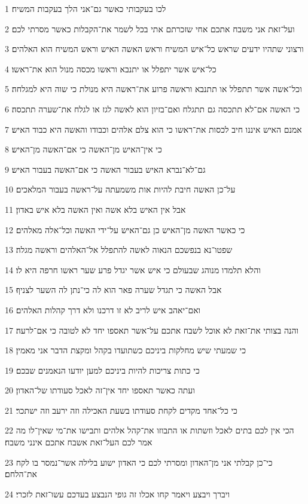 \par 1 לכו בעקבותי כאשר גם־אני הלך בעקבות המשיח׃
\par 2 ועל־זאת אני משבח אתכם אחי שזכרתם אתי בכל לשמר את־הקבלות כאשר מסרתי לכם׃
\par 3 ורצוני שתהיו ידעים שראש כל־איש המשיח וראש האשה האיש וראש המשיח הוא האלהים׃
\par 4 כל־איש אשר יתפלל או יתנבא וראשו מכסה מנול הוא את־ראשו׃
\par 5 וכל־אשה אשר תתפלל או תתנבא וראשה פרוע את־ראשה היא מנולת כי שוה היא למגלחה׃
\par 6 כי האשה אם־לא תתכסה גם תתגלח ואם־בזיון הוא לאשה לגז או לגלח את־שערה תתכסה׃
\par 7 אמנם האיש איננו חיב לכסות את־ראשו כי הוא צלם אלהים וכבודו והאשה היא כבוד האיש׃
\par 8 כי אין־האיש מן־האשה כי אם־האשה מן־האיש׃
\par 9 גם־לא־נברא האיש בעבור האשה כי אם־האשה בעבור האיש׃
\par 10 על־כן האשה חיבת להיות אות משמעתה על־ראשה בעבור המלאכים׃
\par 11 אבל אין האיש בלא אשה ואין האשה בלא איש באדון׃
\par 12 כי כאשר האשה מן־האיש כן גם־האיש על־ידי האשה וכל־אלה מאלהים׃
\par 13 שפטו־נא בנפשכם הנאוה לאשה להתפלל אל־האלהים וראשה מגלה׃
\par 14 והלא תלמדו מנוהג שבעולם כי איש אשר יגדל פרע שער ראשו חרפה היא לו׃
\par 15 אבל האשה כי תגדל שערה פאר הוא לה כי־נתן לה השער לצניף׃
\par 16 ואם־יאהב איש לריב לא זו דרכנו ולא דרך קהלות האלהים׃
\par 17 והנה בצותי את־זאת לא אוכל לשבח אתכם על־אשר תאספו יחד לא לטובה כי אם־לרעה׃
\par 18 כי שמעתי שיש מחלקות ביניכם כשתועדו בקהל ומקצת הדבר אני מאמין׃
\par 19 כי כתות צריכות להיות ביניכם למען יודעו הנאמנים שבכם׃
\par 20 ועתה כאשר תאספו יחד אין־זה לאכל סעודתו של־האדון׃
\par 21 כי כל־אחד מקדים לקחת סעודתו בשעת האכילה וזה ירעב וזה ישתכר׃
\par 22 הכי אין לכם בתים לאכל וזשתות או התבוזו את־קהל אלהים ותבישו את־מי שאין־לו מה אמר לכם העל־זאת אשבח אתכם אינני משבח׃
\par 23 כי־כן קבלתי אני מן־האדון ומסרתי לכם כי האדון ישוע בלילה אשר־נמסר בו לקח את־הלחם׃
\par 24 ויברך ויבצע ויאמר קחו אכלו זה גופי הנבצע בעדכם עשו־זאת לזכרי׃
